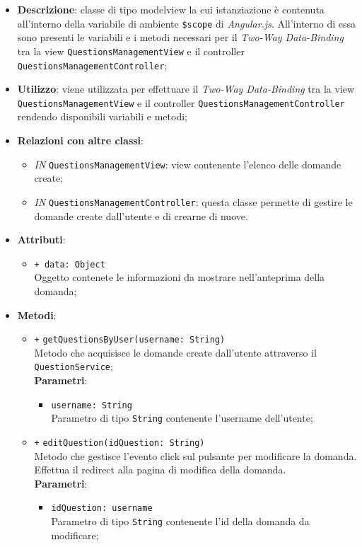 \begin{itemize}
	\item \textbf{Descrizione}: classe di tipo modelview la cui istanziazione è contenuta all'interno della variabile di ambiente \texttt{\$scope} di \textit{Angular.js}. All'interno di essa sono presenti le variabili e i metodi necessari per il \textit{Two-Way Data-Binding} tra la view \texttt{QuestionsManagementView} e il controller \texttt{QuestionsManagementController};
	\item \textbf{Utilizzo}: viene utilizzata per effettuare il \textit{Two-Way Data-Binding} tra la view \texttt{QuestionsManagementView} e il controller \texttt{QuestionsManagementController} rendendo disponibili variabili e metodi;
	\item \textbf{Relazioni con altre classi}: 
	\begin{itemize}
		\item \textit{IN} \texttt{QuestionsManagementView}: view contenente l’elenco delle domande create; 
		\item \textit{IN} \texttt{QuestionsManagementController}: questa classe permette di gestire le domande create dall’utente e di crearne di nuove.
	\end{itemize}
	\item \textbf{Attributi}: 
	\begin{itemize}
		\item \texttt{+ data: Object} \\ Oggetto contenete le informazioni da mostrare nell'anteprima della domanda;
	\end{itemize}
	\item \textbf{Metodi}: 
	\begin{itemize}
			\item \texttt{+} \texttt{getQuestionsByUser(username: String)} \\ 
			Metodo che acquisisce le domande create dall'utente attraverso il \texttt{QuestionService};\\
			\textbf{Parametri}:
			\begin{itemize}
				\item \texttt{username: String} \\
				Parametro di tipo \texttt{String} contenente l'username dell'utente;
			\end{itemize}
			\item \texttt{+} \texttt{editQuestion(idQuestion: String)} \\ 
			Metodo che gestisce l’evento click sul pulsante per modificare la domanda. Effettua il redirect alla pagina di modifica della domanda. \\
			\textbf{Parametri}:
			\begin{itemize}
				\item \texttt{idQuestion: username} \\
				Parametro di tipo \texttt{String} contenente l'id della domanda da modificare;
			\end{itemize}
	\end{itemize}
\end{itemize}	

